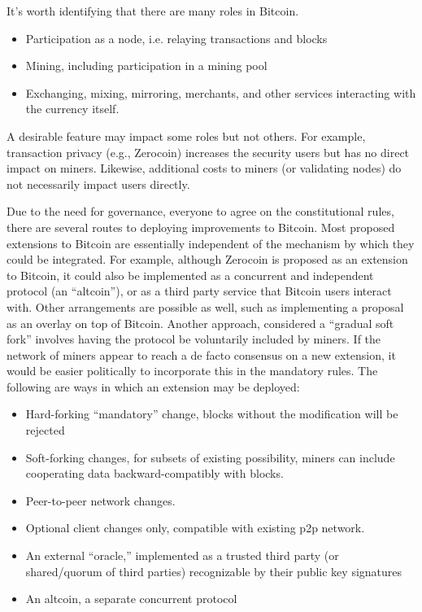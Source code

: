 It's worth identifying that there are many roles in Bitcoin.
\begin{itemize}
\item Participation as a node, i.e. relaying transactions and blocks
\item Mining, including participation in a mining pool
\item Exchanging, mixing, mirroring, merchants, and other services interacting with the currency itself.
\end{itemize}
A desirable feature may impact some roles but not others. For example, transaction privacy (e.g., Zerocoin) increases the security users but has no direct impact on miners. Likewise, additional costs to miners (or validating nodes) do not necessarily impact users directly.

Due to the need for governance, everyone to agree on the constitutional rules, there are several routes to deploying improvements to Bitcoin. Most proposed extensions to Bitcoin are essentially independent of the mechanism by which they could be integrated. For example, although Zerocoin is proposed as an extension to Bitcoin, it could also be implemented as a concurrent and independent protocol (an ``altcoin''), or as a third party service that Bitcoin users interact with. Other arrangements are possible as well, such as implementing a proposal as an overlay on top of Bitcoin. Another approach, considered a ``gradual soft fork'' involves having the protocol be voluntarily included by miners. If the network of miners appear to reach a de facto consensus on a new extension, it would be easier politically to incorporate this in the mandatory rules. The following are ways in which an extension may be deployed:

\begin{itemize}
\item Hard-forking ``mandatory'' change, blocks without the modification will be rejected
\item Soft-forking changes, for subsets of existing possibility, miners can include cooperating data backward-compatibly with blocks.
\item Peer-to-peer network changes.
\item Optional client changes only, compatible with existing p2p network.
\item An external ``oracle,'' implemented as a trusted third party (or shared/quorum of third parties) recognizable by their public key signatures
\item An altcoin, a separate concurrent protocol
\end{itemize}

